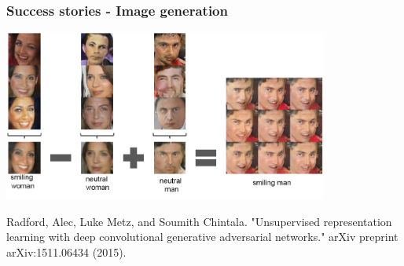 \documentclass[]{article}
\begin{document}
\begin{frame}
	\frametitle{Success stories - Image generation}
	\centering \includegraphics[width=0.8\textwidth]{imggen.pdf}
	\par\footnotesize{Radford, Alec, Luke Metz, and Soumith Chintala. "Unsupervised representation learning with deep convolutional generative adversarial networks." arXiv preprint arXiv:1511.06434 (2015).}
\end{frame}
\end{document}
